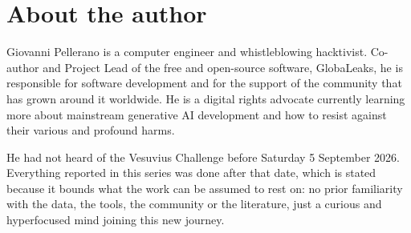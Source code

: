 %
%


\section*{About the author}

Giovanni Pellerano is a computer engineer and whistleblowing hacktivist.
Co-author and Project Lead of the free and open-source software, GlobaLeaks, he
is responsible for software development and for the support of the community that has grown
around it worldwide. He is a digital rights advocate currently learning more about mainstream
generative AI development and how to resist against their various and profound harms.

He had not heard of the Vesuvius Challenge before Saturday 5 September 2026. Everything reported
in this series was done after that date, which is stated because it bounds what the work can be
assumed to rest on: no prior familiarity with the data, the tools, the community or the
literature, just a curious and hyperfocused mind joining this new journey.

